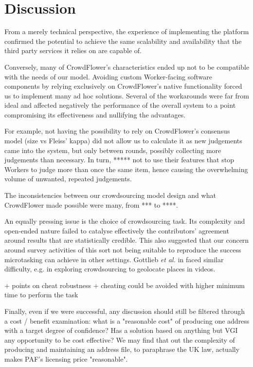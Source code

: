 \section{Discussion}

From a merely technical perspective, the experience of implementing the platform confirmed the potential to achieve the same scalability and availability that the third party services it relies on are capable of.

Conversely, many of CrowdFlower's characteristics ended up not to be compatible with the needs of our model. Avoiding custom Worker-facing software components by relying exclusively on CrowdFlower's native functionality forced us to implement many ad hoc solutions. Several of the workarounds were far from ideal and affected negatively the performance of the overall system to a point compromising its effectiveness and nullifying the advantages. 

For example, not having the possibility to rely on CrowdFlower's consensus model (size vs Fleiss' kappa) did not allow us to calculate it as new judgements came into the system, but only between rounds, possibly collecting more judgements than necessary. In turn, ***** not to use their features that stop Workers to judge more than once the same item, hence causing the overwhelming volume of unwanted, repeated judgements. 


The inconsistencies between our crowdsourcing model design and what CrowdFlower made possible were many, from *** to ****. 


An equally pressing issue is the choice of crowdsourcing task. Its complexity and open-ended nature failed to catalyse effectively the contributors' agreement around results that are statistically credible. This also suggested that our concern around survey activities of this sort not being suitable to reproduce the success microtasking can achieve in other settings. Gottlieb {\it et al.} in \cite{Gottlieb:2012fh} faced similar difficulty, e.g. in exploring crowdsourcing to geolocate places in videos.

+ points on cheat robustness
+ cheating could be avoided with higher minimum time to perform the task

Finally, even if we were successful, any discussion should still be filtered through a cost / benefit examination: what is a "reasonable cost" of producing one address with a target degree of confidence? Has a solution based on anything but VGI any opportunity to be cost effective? We may find that out the complexity of producing and maintaining an address file, to paraphrase the UK law, actually makes PAF's licensing price "reasonable".
